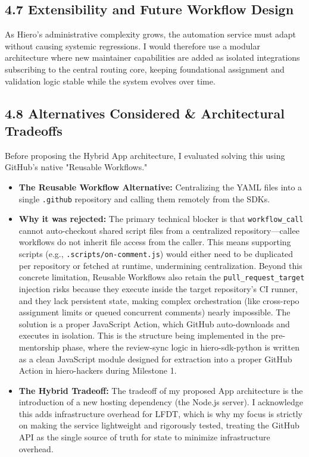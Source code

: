 \documentclass[11pt]{article}
\begin{document}
\subsection*{4.7 Extensibility and Future Workflow Design}

As Hiero's administrative complexity grows, the automation service must adapt without causing systemic regressions. I would therefore use a modular architecture where new maintainer capabilities are added as isolated integrations subscribing to the central routing core, keeping foundational assignment and validation logic stable while the system evolves over time.

\subsection*{4.8 Alternatives Considered \& Architectural Tradeoffs}

Before proposing the Hybrid App architecture, I evaluated solving this using GitHub's native "Reusable Workflows." 
\begin{itemize}[leftmargin=18pt,itemsep=2pt,topsep=0pt]
    \item \textbf{The Reusable Workflow Alternative:} Centralizing the YAML files into a single \texttt{.github} repository and calling them remotely from the SDKs.
    \item \textbf{Why it was rejected:} The primary technical blocker is that \texttt{workflow\_call} cannot auto-checkout shared script files from a centralized repository—callee workflows do not inherit file access from the caller. This means supporting scripts (e.g., \texttt{.scripts/on-comment.js}) would either need to be duplicated per repository or fetched at runtime, undermining centralization. Beyond this concrete limitation, Reusable Workflows also retain the \texttt{pull\_request\_target} injection risks because they execute inside the target repository's CI runner, and they lack persistent state, making complex orchestration (like cross-repo assignment limits or queued concurrent comments) nearly impossible. The solution is a proper JavaScript Action, which GitHub auto-downloads and executes in isolation. This is the structure being implemented in the pre-mentorship phase, where the review-sync logic in hiero-sdk-python is written as a clean JavaScript module designed for extraction into a proper GitHub Action in hiero-hackers during Milestone 1.
    \item \textbf{The Hybrid Tradeoff:} The tradeoff of my proposed App architecture is the introduction of a new hosting dependency (the Node.js server). I acknowledge this adds infrastructure overhead for LFDT, which is why my focus is strictly on making the service lightweight and rigorously tested, treating the GitHub API as the single source of truth for state to minimize infrastructure overhead.
\end{itemize}
\end{document}
